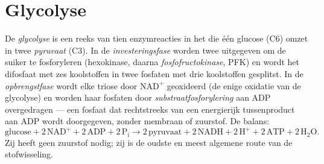 \section{Glycolyse}

\begin{definition}[Glycolyse]\label{def:b1:respiration-fermentation:glycolysis}
De \emph{glycolyse} is een reeks van tien enzymreacties in het  die één
glucose (C6) omzet in twee \emph{pyruvaat} (C3). In de \emph{investeringsfase}
worden twee  uitgegeven om de suiker te fosforyleren (hexokinase, daarna
\emph{fosfofructokinase}, PFK) en wordt het difosfaat met zes koolstoffen in twee
fosfaten met drie koolstoffen gesplitst. In de \emph{opbrengstfase} wordt elke
triose door $\mathrm{NAD^+}$ geoxideerd (de enige oxidatie van de glycolyse) en
worden haar fosfaten door \emph{substraatfosforylering}
aan ADP overgedragen --- een fosfaat dat rechtstreeks van een energierijk
tussenproduct aan ADP wordt doorgegeven, zonder membraan of zuurstof. De balans:
\[
\text{glucose} + 2\,\mathrm{NAD^+} + 2\,\mathrm{ADP} + 2\,\mathrm{P_i}
\to 2\,\text{pyruvaat} + 2\,\mathrm{NADH} + 2\,\mathrm{H^+} + 2\,\mathrm{ATP} + 2\,\mathrm{H_2O} .
\]
Zij heeft geen zuurstof nodig; zij is de oudste en meest algemene route van de
stofwisseling.
\end{definition}

